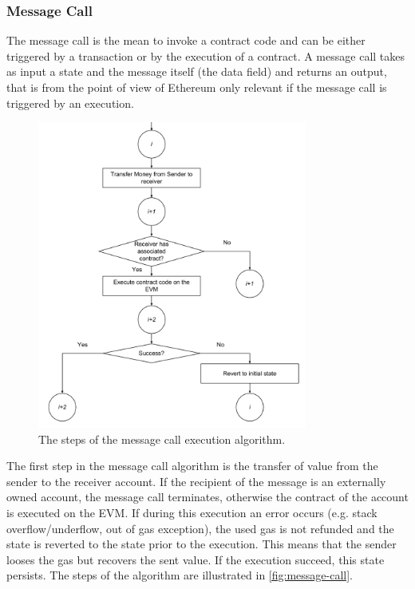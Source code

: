 \subsubsection{Message Call}
\label{sec:message-call}

The message call is the mean to invoke a contract code and can be either
triggered by a transaction or by the execution of a contract. A message call
takes as input a state and the message itself (the data field) and returns an
output, that is from the point of view of Ethereum only relevant if the message
call is triggered by an execution.

\begin{figure}[h!]
	\begin{center}
		\includegraphics[width=0.79\textwidth]{./res/img/message-call.pdf}
	\end{center}
	\caption{The steps of the message call execution algorithm.}
	\label{fig:message-call}
\end{figure}

The first step in the message call algorithm is the transfer of value from the
sender to the receiver account. If the recipient of the message is an externally
owned account, the message call terminates, otherwise the contract of the
account is executed on the EVM. If during this execution an error occurs (e.g.
stack overflow/underflow, out of gas exception), the used gas is not refunded
and the state is reverted to the state prior to the execution. This means that
the sender looses the gas but recovers the sent value. If the execution succeed,
this state persists. The steps of the algorithm are illustrated in
\autoref{fig:message-call}.
